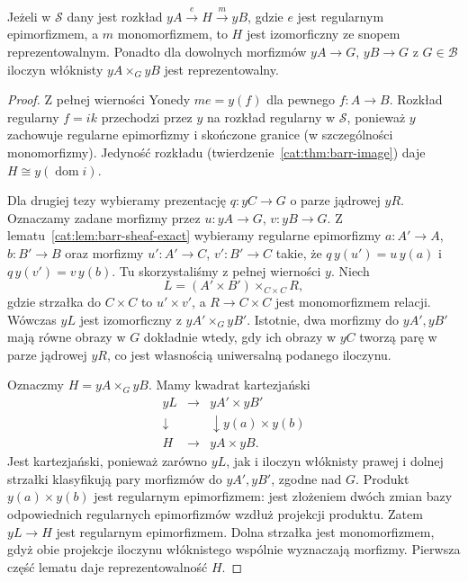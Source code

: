 \begin{lemat}\label{cat:lem:barr-covered-subobject}
Jeżeli w $\mathcal S$ dany jest rozkład $yA\xrightarrow{e}H\xrightarrow{m}yB$, gdzie $e$ jest regularnym epimorfizmem, a $m$ monomorfizmem, to $H$ jest izomorficzny ze snopem reprezentowalnym. Ponadto dla dowolnych morfizmów $yA\to G$, $yB\to G$ z $G\in\mathcal B$ iloczyn włóknisty $yA\times_G yB$ jest reprezentowalny.
\end{lemat}
\begin{proof}
Z pełnej wierności Yonedy $me=y(f)$ dla pewnego $f:A\to B$. Rozkład regularny $f=ik$ przechodzi przez $y$ na rozkład regularny w $\mathcal S$, ponieważ $y$ zachowuje regularne epimorfizmy i skończone granice (w szczególności monomorfizmy). Jedyność rozkładu (twierdzenie~\ref{cat:thm:barr-image}) daje $H\cong y(\operatorname{dom}i)$.

Dla drugiej tezy wybieramy prezentację $q:yC\to G$ o parze jądrowej $yR$. Oznaczamy zadane morfizmy przez $u:yA\to G$, $v:yB\to G$. Z lematu~\ref{cat:lem:barr-sheaf-exact} wybieramy regularne epimorfizmy $a:A'\to A$, $b:B'\to B$ oraz morfizmy $u':A'\to C$, $v':B'\to C$ takie, że $q\,y(u')=u\,y(a)$ i $q\,y(v')=v\,y(b)$. Tu skorzystaliśmy z pełnej wierności $y$. Niech
\[
 L=(A'\times B')\times_{C\times C}R,
\]
gdzie strzałka do $C\times C$ to $u'\times v'$, a $R\to C\times C$ jest monomorfizmem relacji. Wówczas $yL$ jest izomorficzny z $yA'\times_G yB'$. Istotnie, dwa morfizmy do $yA',yB'$ mają równe obrazy w $G$ dokładnie wtedy, gdy ich obrazy w $yC$ tworzą parę w parze jądrowej $yR$, co jest własnością uniwersalną podanego iloczynu.

Oznaczmy $H=yA\times_G yB$. Mamy kwadrat kartezjański
\[
\begin{array}{ccc}
 yL &\longrightarrow& yA'\times yB'\\
 \downarrow &&\downarrow\scriptstyle y(a)\times y(b)\\
 H &\longrightarrow& yA\times yB .
\end{array}
\]
Jest kartezjański, ponieważ zarówno $yL$, jak i iloczyn włóknisty prawej i dolnej strzałki klasyfikują pary morfizmów do $yA',yB'$, zgodne nad $G$. Produkt $y(a)\times y(b)$ jest regularnym epimorfizmem: jest złożeniem dwóch zmian bazy odpowiednich regularnych epimorfizmów wzdłuż projekcji produktu. Zatem $yL\to H$ jest regularnym epimorfizmem. Dolna strzałka jest monomorfizmem, gdyż obie projekcje iloczynu włóknistego wspólnie wyznaczają morfizmy. Pierwsza część lematu daje reprezentowalność $H$.
\end{proof}

